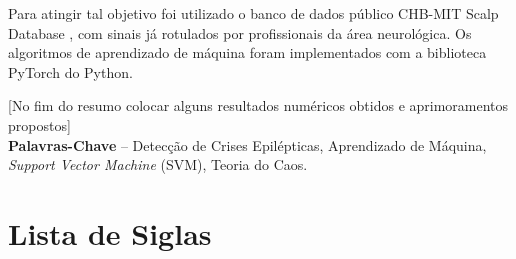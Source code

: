 \documentclass[]{article}
\begin{document}
	Para atingir tal objetivo foi utilizado o banco de dados público CHB-MIT Scalp Database \cite{physionet_chbmit}, com sinais já rotulados por profissionais da área neurológica. Os algoritmos de aprendizado de máquina foram implementados com a biblioteca PyTorch \cite{ansel2024pytorch2} do Python.
	
	[No fim do resumo colocar alguns resultados numéricos obtidos e aprimoramentos propostos]
	\\[3\baselineskip]
	\textbf{Palavras-Chave} -- Detecção de Crises Epilépticas, Aprendizado de Máquina, \textit{Support Vector Machine} (SVM), Teoria do Caos.

	\clearpage

	\section*{Lista de Siglas}
\end{document}
